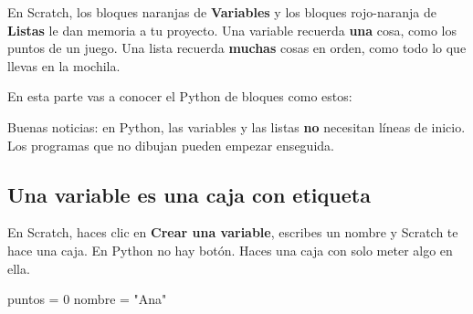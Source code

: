 
En Scratch, los bloques naranjas de \textbf{Variables} y los bloques rojo-naranja de \textbf{Listas} le dan memoria a tu proyecto. Una variable recuerda \textbf{una} cosa, como los puntos de un juego. Una lista recuerda \textbf{muchas} cosas en orden, como todo lo que llevas en la mochila.

En esta parte vas a conocer el Python de bloques como estos:

 \quad {} \quad {}

 \quad {}

 \quad {}

Buenas noticias: en Python, las variables y las listas \textbf{no} necesitan líneas de inicio. Los programas que no dibujan pueden empezar enseguida.

\subsection*{Una variable es una caja con etiqueta}

En Scratch, haces clic en \textbf{Crear una variable}, escribes un nombre y Scratch te hace una caja. En Python no hay botón. Haces una caja con solo meter algo en ella.

\begin{tcbraster}[raster columns=2, raster equal height=rows, raster column skip=12pt, raster valign=center]
\begin{tcolorbox}[colback=white, colframe=white, boxrule=0pt, valign=center]
\begin{scratch}
\end{scratch}
\end{tcolorbox}
\begin{code}
puntos = 0
nombre = "Ana"
\end{code}
\end{tcbraster}

